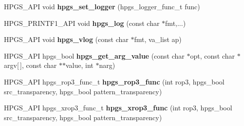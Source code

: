 \begin{CompactItemize}
\item 
HPGS\_\-API void {\bf hpgs\_\-set\_\-logger} (hpgs\_\-logger\_\-func\_\-t func)
\item 
HPGS\_\-PRINTF1\_\-API void {\bf hpgs\_\-log} (const char $\ast$fmt,...)
\item 
HPGS\_\-API void {\bf hpgs\_\-vlog} (const char $\ast$fmt, va\_\-list ap)
\item 
HPGS\_\-API hpgs\_\-bool {\bf hpgs\_\-get\_\-arg\_\-value} (const char $\ast$opt, const char $\ast$argv[$\,$], const char $\ast$$\ast$value, int $\ast$narg)
\item 
HPGS\_\-API hpgs\_\-rop3\_\-func\_\-t \textbf{hpgs\_\-rop3\_\-func} (int rop3, hpgs\_\-bool src\_\-transparency, hpgs\_\-bool pattern\_\-transparency)\label{group__base_g028f514a3b58348a40c435d69749f0fb}

\item 
HPGS\_\-API hpgs\_\-xrop3\_\-func\_\-t \textbf{hpgs\_\-xrop3\_\-func} (int rop3, hpgs\_\-bool src\_\-transparency, hpgs\_\-bool pattern\_\-transparency)\label{group__base_gf10e4f96ae58786ee0d86420a2a6d899}


\end{CompactItemize}

